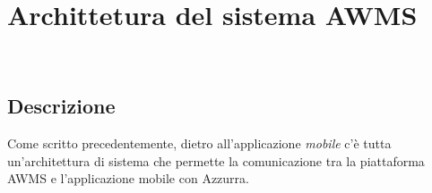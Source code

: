 \chapter{Archittetura del sistema AWMS}
\label{cap:archittettura del sistema AWMS}

\\


\section{Descrizione}
Come scritto precedentemente, dietro all'applicazione \emph{mobile} c'è tutta un'\gls{architettura}\ap{[g]} di sistema che permette la comunicazione tra la piattaforma \gls{AWMS} e l'applicazione mobile con Azzurra.
 
